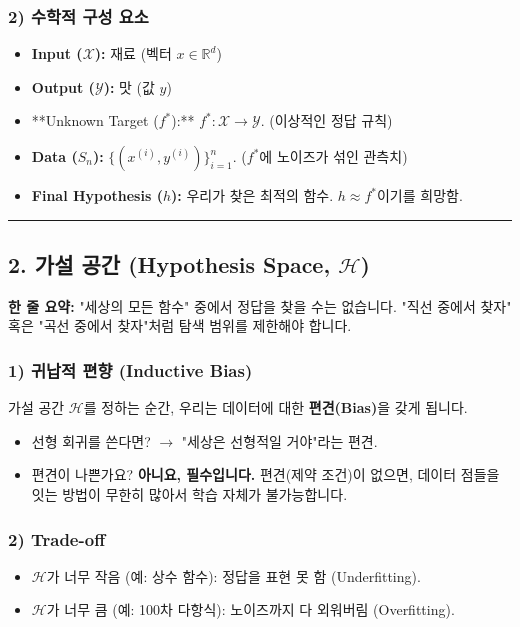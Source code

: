 \documentclass[11pt,a4paper]{book}
\theoremstyle{definition}
\begin{document}
\subsubsection*{2) 수학적 구성 요소}
\begin{itemize}
    \item \textbf{Input ($\mathcal{X}$):} 재료 (벡터 $x \in \mathbb{R}^d$)
    \item \textbf{Output ($\mathcal{Y}$):} 맛 (값 $y$)
    \item **Unknown Target ($f^*$):** $f^*: \mathcal{X} \to \mathcal{Y}$. (이상적인 정답 규칙)
    \item \textbf{Data ($S_n$):} $\{(x^{(i)}, y^{(i)})\}_{i=1}^n$. ($f^*$에 노이즈가 섞인 관측치)
    \item \textbf{Final Hypothesis ($h$):} 우리가 찾은 최적의 함수. $h \approx f^*$이기를 희망함.
\end{itemize}

\vspace{0.5cm}\hrule\vspace{0.5cm}

\subsection{2. 가설 공간 (Hypothesis Space, $\mathcal{H}$)}

\begin{conceptbox}[title={개념 2: 수색 범위 설정}]
\textbf{한 줄 요약:} "세상의 모든 함수" 중에서 정답을 찾을 수는 없습니다. "직선 중에서 찾자" 혹은 "곡선 중에서 찾자"처럼 탐색 범위를 제한해야 합니다.
\end{conceptbox}

\subsubsection*{1) 귀납적 편향 (Inductive Bias)}
가설 공간 $\mathcal{H}$를 정하는 순간, 우리는 데이터에 대한 \textbf{편견(Bias)}을 갖게 됩니다.
\begin{itemize}
    \item 선형 회귀를 쓴다면? $\rightarrow$ "세상은 선형적일 거야"라는 편견.
    \item 편견이 나쁜가요? \textbf{아니요, 필수입니다.} 편견(제약 조건)이 없으면, 데이터 점들을 잇는 방법이 무한히 많아서 학습 자체가 불가능합니다.
\end{itemize}

\subsubsection*{2) Trade-off}
\begin{itemize}
    \item $\mathcal{H}$가 너무 작음 (예: 상수 함수): 정답을 표현 못 함 (Underfitting).
    \item $\mathcal{H}$가 너무 큼 (예: 100차 다항식): 노이즈까지 다 외워버림 (Overfitting).
\end{itemize}
\end{document}

